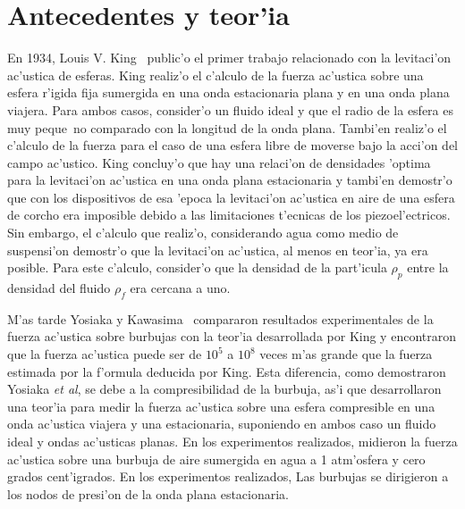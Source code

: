 \section{Antecedentes y teor'ia}
\label{sec:antecedentes}


En 1934, Louis V. King~\cite{king34} public'o el primer trabajo relacionado con la levitaci'on ac'ustica de
esferas. King realiz'o el c'alculo de la fuerza ac'ustica sobre una esfera r'igida fija sumergida en una
onda estacionaria plana y en una onda plana viajera. Para ambos casos, consider'o un fluido ideal y que el
radio de la esfera es muy peque~no comparado con la longitud de la onda plana. Tambi'en realiz'o el c'alculo
de la fuerza para el caso de una  esfera  libre de moverse bajo la acci'on del campo ac'ustico. 
King concluy'o que hay una relaci'on de densidades 'optima para la levitaci'on ac'ustica en una onda plana
estacionaria y tambi'en demostr'o que con los dispositivos de esa 'epoca la levitaci'on ac'ustica en aire de una 
esfera de corcho era imposible debido a las limitaciones t'ecnicas de los piezoel'ectricos. Sin embargo,
el c'alculo que realiz'o, considerando agua como medio de suspensi'on demostr'o que la levitaci'on ac'ustica,
al menos en teor'ia, ya era posible. Para este c'alculo, consider'o que la densidad de la part'icula $\rho_p$ 
entre la densidad del fluido $\rho_f$ era cercana a uno.


M'as tarde Yosiaka y Kawasima~\cite{yosiaka55} compararon resultados experimentales
de la fuerza ac'ustica sobre burbujas con la teor'ia desarrollada por King  y encontraron que la fuerza ac'ustica
puede ser de $10^5$ a $10^8$ veces m'as grande que la fuerza estimada por la f'ormula deducida por 
King. Esta diferencia, como demostraron Yosiaka {\it et al}, se debe a la compresibilidad
de la burbuja, as'i que desarrollaron una teor'ia para medir la fuerza ac'ustica sobre una esfera compresible en 
una onda ac'ustica viajera y una estacionaria, suponiendo en ambos caso un fluido  ideal y ondas ac'usticas planas. 
En los experimentos realizados, midieron la fuerza ac'ustica  sobre una burbuja 
de aire sumergida en agua a 1 atm'osfera y cero grados cent'igrados. En los experimentos realizados,
Las burbujas   se dirigieron a los nodos de presi'on de la onda plana estacionaria. 

